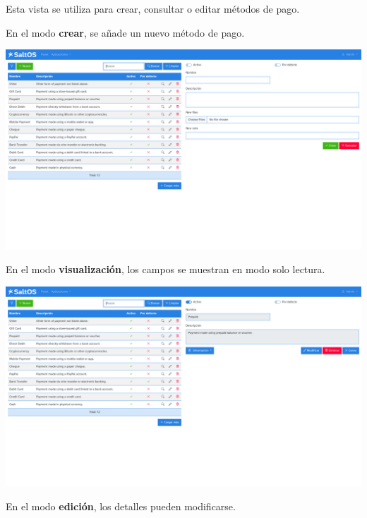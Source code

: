 \documentclass[a4paper]{article}
\begin{document}
Esta vista se utiliza para crear, consultar o editar métodos de pago.

En el modo \textbf{crear}, se añade un nuevo método de pago.

\begin{center}\includegraphics[width=1\textwidth]{../ujest/snaps/test-screenshots-js-screenshots-sales-payment-methods-create-es-es-1-snap.png}\end{center}

En el modo \textbf{visualización}, los campos se muestran en modo solo lectura.

\begin{center}\includegraphics[width=1\textwidth]{../ujest/snaps/test-screenshots-js-screenshots-sales-payment-methods-view-10-es-es-1-snap.png}\end{center}

En el modo \textbf{edición}, los detalles pueden modificarse.
\end{document}
